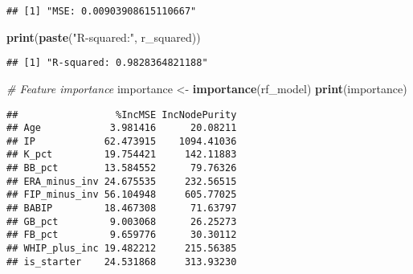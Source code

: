 \documentclass[
]{article}
\newenvironment{Shaded}{\begin{snugshade}}{\end{snugshade}}
\newcommand{\CommentTok}[1]{\textcolor[rgb]{0.56,0.35,0.01}{\textit{#1}}}
\newcommand{\DecValTok}[1]{\textcolor[rgb]{0.00,0.00,0.81}{#1}}
\newcommand{\FunctionTok}[1]{\textcolor[rgb]{0.13,0.29,0.53}{\textbf{#1}}}
\newcommand{\NormalTok}[1]{#1}
\newcommand{\OtherTok}[1]{\textcolor[rgb]{0.56,0.35,0.01}{#1}}
\newcommand{\SpecialCharTok}[1]{\textcolor[rgb]{0.81,0.36,0.00}{\textbf{#1}}}
\newcommand{\StringTok}[1]{\textcolor[rgb]{0.31,0.60,0.02}{#1}}
\begin{document}
\begin{Shaded}
\end{Shaded}

\begin{verbatim}
## [1] "MSE: 0.00903908615110667"
\end{verbatim}

\begin{Shaded}
\begin{Highlighting}[]
\FunctionTok{print}\NormalTok{(}\FunctionTok{paste}\NormalTok{(}\StringTok{"R{-}squared:"}\NormalTok{, r\_squared))}
\end{Highlighting}
\end{Shaded}

\begin{verbatim}
## [1] "R-squared: 0.9828364821188"
\end{verbatim}

\begin{Shaded}
\begin{Highlighting}[]
\CommentTok{\# Feature importance}
\NormalTok{importance }\OtherTok{\textless{}{-}} \FunctionTok{importance}\NormalTok{(rf\_model)}
\FunctionTok{print}\NormalTok{(importance)}
\end{Highlighting}
\end{Shaded}

\begin{verbatim}
##                 %IncMSE IncNodePurity
## Age            3.981416      20.08211
## IP            62.473915    1094.41036
## K_pct         19.754421     142.11883
## BB_pct        13.584552      79.76326
## ERA_minus_inv 24.675535     232.56515
## FIP_minus_inv 56.104948     605.77025
## BABIP         18.467308      71.63797
## GB_pct         9.003068      26.25273
## FB_pct         9.659776      30.30112
## WHIP_plus_inc 19.482212     215.56385
## is_starter    24.531868     313.93230
\end{verbatim}
\end{document}

